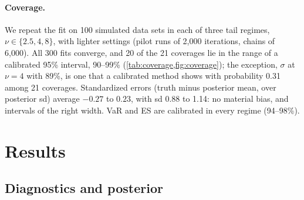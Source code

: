 \documentclass[12pt]{article}
\begin{document}
\begin{table}[t]
  \centering
  \caption{Recovery of the true values on one simulated data set of the real size, with the diagnostics of the fit.}
  \label{tab:recovery}
  \footnotesize
  
\end{table}

\paragraph{Coverage.} We repeat the fit on 100 simulated data sets in each of three tail regimes, $\nu \in \{2.5, 4, 8\}$, with lighter settings (pilot runs of 2,000 iterations, chains of 6,000). All 300 fits converge, and 20 of the 21 coverages lie in the range of a calibrated 95\% interval, 90--99\% (\cref{tab:coverage,fig:coverage}); the exception, $\sigma$ at $\nu = 4$ with 89\%, is one that a calibrated method shows with probability 0.31 among 21 coverages. Standardized errors (truth minus posterior mean, over posterior sd) average $-0.27$ to $0.23$, with sd 0.88 to 1.14: no material bias, and intervals of the right width. VaR and ES are calibrated in every regime (94--98\%).

\begin{table}[t]
  \centering
  \caption{Coverage (\%) of the 95\% intervals over 100 simulated data sets per regime ($\mu = 0.1\%$, $\sigma = 0.7\%$), and fits passing the convergence targets; a calibrated interval gives 90--99\%.}
  \label{tab:coverage}
  \footnotesize
  \setlength{\tabcolsep}{4pt}
  
\end{table}

\section{Results}\label{sec:results}

\subsection{Diagnostics and posterior}\label{sec:posterior}

\begin{table}[t]
  \centering
  \caption{Posterior summaries and diagnostics on the real data. Implied sd of the Student-$t$: $\sigma\sqrt{\nu/(\nu-2)}$; MCSE: Monte Carlo standard error of the mean, $\mathrm{sd}/\sqrt{\mathrm{ESS}}$.}
  \label{tab:posterior}
  \footnotesize
  
\end{table}
\end{document}
